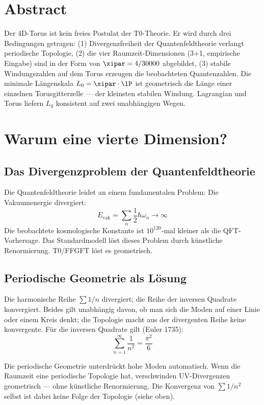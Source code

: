 \section*{Abstract}

Der 4D-Torus ist kein freies Postulat der T0-Theorie. Er wird durch drei Bedingungen getragen: (1) Divergenzfreiheit der Quantenfeldtheorie verlangt periodische Topologie, (2) die vier Raumzeit-Dimensionen (3+1, empirische Eingabe) sind in der Form von $\xipar = 4/30000$ abgebildet, (3) stabile Windungszahlen auf dem Torus erzeugen die beobachteten Quantenzahlen. Die minimale Längenskala $L_0 = \xipar \cdot \lP$ ist geometrisch die Länge einer einzelnen Torusgitterzelle — der kleinsten stabilen Windung. Lagrangian und Torus liefern $L_0$ konsistent auf zwei unabhängigen Wegen.

\section{Warum eine vierte Dimension?}

\subsection{Das Divergenzproblem der Quantenfeldtheorie}

Die Quantenfeldtheorie leidet an einem fundamentalen Problem: Die Vakuumenergie divergiert:
\begin{equation}
	E_{\text{vak}} = \sum_n \frac{1}{2}\hbar\omega_n \rightarrow \infty
\end{equation}
Die beobachtete kosmologische Konstante ist $10^{120}$-mal kleiner als die QFT-Vorhersage. Das Standardmodell löst dieses Problem durch künstliche Renormierung. T0/FFGFT löst es geometrisch.

\subsection{Periodische Geometrie als Lösung}

Die harmonische Reihe $\sum 1/n$ divergiert; die Reihe der inversen Quadrate konvergiert. Beides gilt unabhängig davon, ob man sich die Moden auf einer Linie oder einem Kreis denkt; die Topologie macht aus der divergenten Reihe keine konvergente. Für die inversen Quadrate gilt (Euler 1735):
\begin{equation}
	\sum_{n=1}^{\infty} \frac{1}{n^2} = \frac{\pi^2}{6}
\end{equation}

\begin{keypoint}
Die periodische Geometrie unterdrückt hohe Moden automatisch. Wenn die Raumzeit eine periodische Topologie hat, verschwinden UV-Divergenzen geometrisch — ohne künstliche Renormierung. Die Konvergenz von $\sum 1/n^2$ selbst ist dabei keine Folge der Topologie (siehe oben).
\end{keypoint}

